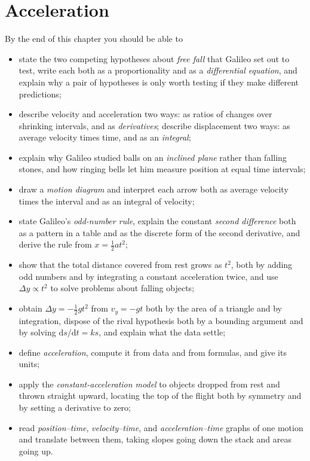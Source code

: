 \documentclass[11pt,twoside,openany]{book}
\newcommand{\dd}{\mathrm{d}}
\begin{document}
\setcounter{chapter}{1}

\chapter{Acceleration}

\begin{tcolorbox}[enhanced,colback=white,colframe=teal,sharp corners,boxrule=1pt,
  title=\textbf{In this chapter},coltitle=white,colbacktitle=teal,left=3mm,right=3mm]
By the end of this chapter you should be able to
\begin{itemize}[itemsep=2pt,topsep=2pt]
  \item state the two competing hypotheses about \emph{free fall} that Galileo set out to test, write each both as a proportionality and as a \emph{differential equation}, and explain why a pair of hypotheses is only worth testing if they make different predictions;
  \item describe velocity and acceleration two ways: as ratios of changes over shrinking intervals, and as \emph{derivatives}; describe displacement two ways: as average velocity times time, and as an \emph{integral};
  \item explain why Galileo studied balls on an \emph{inclined plane} rather than falling stones, and how ringing bells let him measure position at equal time intervals;
  \item draw a \emph{motion diagram} and interpret each arrow both as average velocity times the interval and as an integral of velocity;
  \item state Galileo's \emph{odd-number rule}, explain the constant \emph{second difference} both as a pattern in a table and as the discrete form of the second derivative, and derive the rule from $x = \tfrac12 a t^2$;
  \item show that the total distance covered from rest grows as $t^2$, both by adding odd numbers and by integrating a constant acceleration twice, and use $\Delta y \propto t^2$ to solve problems about falling objects;
  \item obtain $\Delta y = -\tfrac12 g t^2$ from $v_y = -g t$ both by the area of a triangle and by integration, dispose of the rival hypothesis both by a bounding argument and by solving $\dd s/\dd t = k s$, and explain what the data settle;
  \item define \emph{acceleration}, compute it from data and from formulas, and give its units;
  \item apply the \emph{constant-acceleration model} to objects dropped from rest and thrown straight upward, locating the top of the flight both by symmetry and by setting a derivative to zero;
  \item read \emph{position--time}, \emph{velocity--time}, and \emph{acceleration--time} graphs of one motion and translate between them, taking slopes going down the stack and areas going up.
\end{itemize}
\end{tcolorbox}
\end{document}
